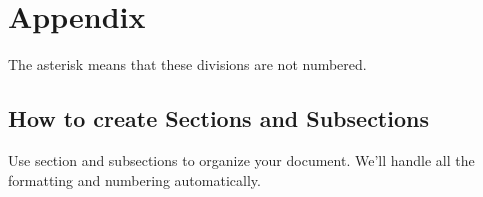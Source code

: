 \documentclass[twocolumn]{article}
\begin{document}
\bigskip

\section*{Appendix}

The asterisk means that these divisions are not numbered.

\subsection*{How to create Sections and Subsections}

Use section and subsections to organize your document. We'll handle all the formatting and numbering automatically.
\end{document}
